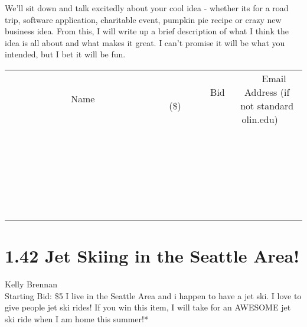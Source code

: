 \documentclass[11pt]{article}
\begin{document}
We'll sit down and talk excitedly about your cool idea - whether its for a road trip, software application, charitable event, pumpkin pie recipe or crazy new business idea. From this, I will write up a brief description of what I think the idea is all about and what makes it great. I can't promise it will be what you intended, but I bet it will be fun.
\\[6ex]
\begin{tabular}{c c c}
~~~~~~~~~~~~~Name~~~~~~~~~~~~~ & ~~~~~~~~~Bid (\$)~~~~~~~~~  & ~~~Email Address (if not standard olin.edu)~~~\\
 & & \\
\hline
 & & \\
\hline
 & & \\
\hline
 & & \\
\hline
 & & \\
\hline
 & & \\
\hline
 & & \\
\hline
 & & \\
\hline
 & & \\
\hline
 & & \\
\hline
 & & \\
\hline
 & & \\
\hline
 & & \\
\hline
 & & \\
\hline
 & & \\
\hline
 & & \\
\hline
 & & \\
\hline
 & & \\
\hline
 & & \\
\hline
 & & \\
\hline
 & & \\
\hline
 & & \\
\hline
 & & \\
\hline
 & & \\
\hline
 & & \\
\hline
 & & \\
\hline
\end{tabular}
\newpage
\section*{1.42 Jet Skiing in the Seattle Area!}
Kelly Brennan
\\
Starting Bid: \$5
\newline
I live in the Seattle Area and i happen to have a jet ski. I love to give people jet ski rides! If you win this item, I will take for an AWESOME jet ski ride when I am home this summer!* 
\end{document}
